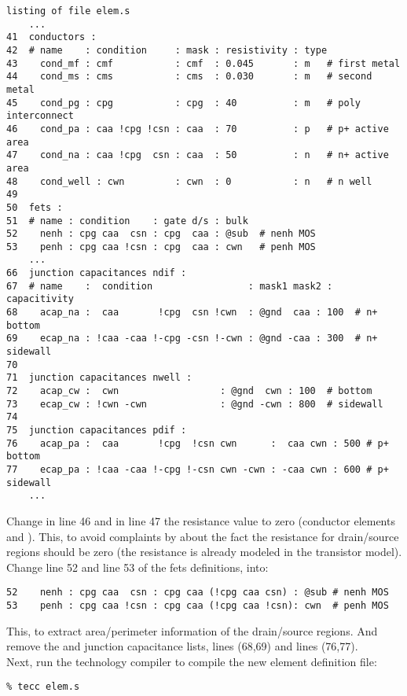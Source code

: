 \small \begin{Verbatim}[frame=single]
listing of file elem.s
    ...
41  conductors :
42  # name    : condition     : mask : resistivity : type
43    cond_mf : cmf           : cmf  : 0.045       : m   # first metal
44    cond_ms : cms           : cms  : 0.030       : m   # second metal
45    cond_pg : cpg           : cpg  : 40          : m   # poly interconnect
46    cond_pa : caa !cpg !csn : caa  : 70          : p   # p+ active area
47    cond_na : caa !cpg  csn : caa  : 50          : n   # n+ active area
48    cond_well : cwn         : cwn  : 0           : n   # n well
49
50  fets :
51  # name : condition    : gate d/s : bulk
52    nenh : cpg caa  csn : cpg  caa : @sub  # nenh MOS
53    penh : cpg caa !csn : cpg  caa : cwn   # penh MOS
    ...
66  junction capacitances ndif :
67  # name    :  condition                 : mask1 mask2 : capacitivity
68    acap_na :  caa       !cpg  csn !cwn  : @gnd  caa : 100  # n+ bottom
69    ecap_na : !caa -caa !-cpg -csn !-cwn : @gnd -caa : 300  # n+ sidewall
70
71  junction capacitances nwell :
72    acap_cw :  cwn                  : @gnd  cwn : 100  # bottom
73    ecap_cw : !cwn -cwn             : @gnd -cwn : 800  # sidewall
74
75  junction capacitances pdif :
76    acap_pa :  caa       !cpg  !csn cwn      :  caa cwn : 500 # p+ bottom
77    ecap_pa : !caa -caa !-cpg !-csn cwn -cwn : -caa cwn : 600 # p+ sidewall
    ...
\end{Verbatim}
\normalsize
Change in line 46 and in line 47 the resistance value to zero
(conductor elements  and ).
This, to avoid complaints by  about the fact the resistance for drain/source
regions should be zero (the resistance is already modeled in the transistor model).
\\[1 ex]
Change line 52 and line 53 of the fets definitions, into:
\small \begin{Verbatim}[frame=single]
52    nenh : cpg caa  csn : cpg caa (!cpg caa csn) : @sub # nenh MOS
53    penh : cpg caa !csn : cpg caa (!cpg caa !csn): cwn  # penh MOS
\end{Verbatim}
\normalsize
This, to extract area/perimeter information of the drain/source regions.
And remove the  and  junction capacitance lists,
lines (68,69) and lines (76,77).
\\[1 ex]
Next, run the technology compiler  to compile the new element definition file:
\small
\begin{Verbatim}
% tecc elem.s
\end{Verbatim}
